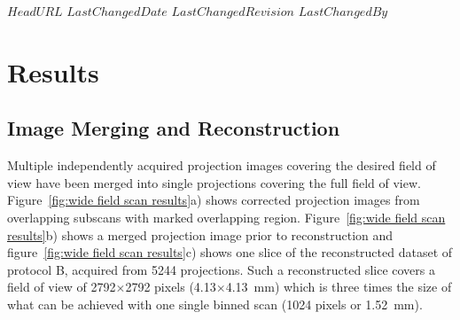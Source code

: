 \svnidlong
{$HeadURL$}
{$LastChangedDate$}
{$LastChangedRevision$}
{$LastChangedBy$}

\ifhtml
\else
\begin{center}
\end{center}
\fi

\section{Results}%
\label{sec:Results}%
\subsection{Image Merging and Reconstruction}%
\label{sec:Image Merging and Reconstruction}%
Multiple independently acquired projection images covering the desired field of view have been merged into single projections covering the full field of view. Figure~\ref{fig:wide field scan results}a) shows corrected projection images from overlapping subscans with marked overlapping region. Figure~\ref{fig:wide field scan results}b) shows a merged projection image prior to reconstruction and figure~\ref{fig:wide field scan results}c) shows one slice of the reconstructed dataset of protocol B, acquired from 5244 projections. Such a reconstructed slice covers a field of view of 2792$\times$2792 pixels (4.13$\times$\SI{4.13}{\milli\meter}) which is three times the size of what can be achieved with one single binned scan (1024 pixels or \SI{1.52}{\milli\meter}). %

